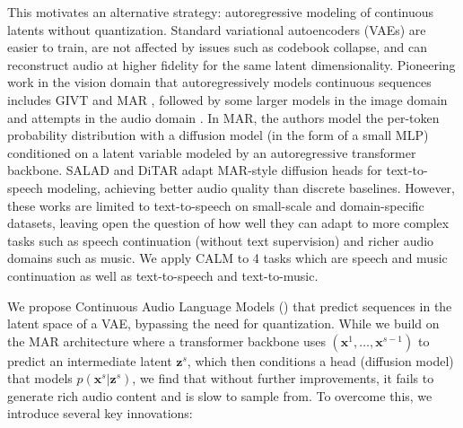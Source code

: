 This motivates an alternative strategy: autoregressive modeling of continuous latents without quantization. Standard variational autoencoders (VAEs) are easier to train, are not affected by issues such as codebook collapse, and can reconstruct audio at higher fidelity for the same latent dimensionality. Pioneering work in the vision domain that autoregressively models continuous sequences includes GIVT \citep{givt} and MAR \citep{autoreg_image_quant}, followed by some larger models in the image domain \citep{fluid, dart} and attempts in the audio domain \citep{salad, sony_trick, ditar, yang2025generativeaudiolanguagemodeling}. In MAR, the authors model the per-token probability distribution with a diffusion model (in the form of a small MLP) conditioned on a latent variable modeled by an autoregressive transformer backbone. 
SALAD \citep{salad} and DiTAR \citep{ditar} adapt MAR-style diffusion heads for text-to-speech modeling, achieving better audio quality than discrete baselines. However, these works are limited to text-to-speech on small-scale and domain-specific datasets, leaving open the question of how well they can adapt to more complex tasks such as speech continuation (without text supervision) and richer audio domains such as music. We apply CALM to 4 tasks which are speech and music continuation as well as text-to-speech and text-to-music.

We propose Continuous Audio Language Models (\ours{}) that predict sequences in the latent space of a VAE, bypassing the need for quantization. While we build on the MAR architecture where a transformer backbone uses $(\mathbf{x}^1, \ldots, \mathbf{x}^{s-1})$ to predict an intermediate latent $\mathbf{z}^s$, which then conditions a head (diffusion model) that models $p(\mathbf{x}^s \vert \mathbf{z}^s)$, we find that without further improvements, it fails to generate rich audio content and is slow to sample from. To overcome this, we introduce several key innovations:

